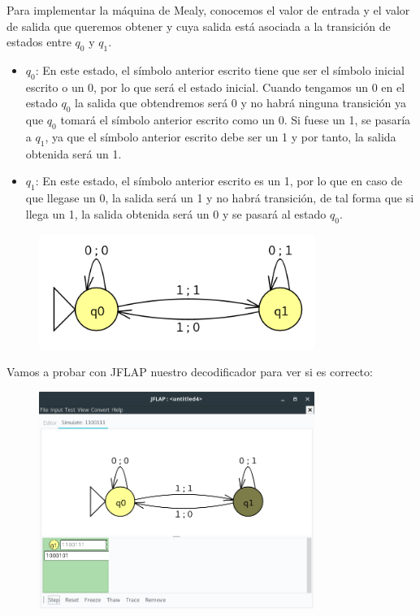\documentclass[10pt,a4paper,spanish]{report}
\begin{document}
\noindent
Para implementar la máquina de Mealy, conocemos el valor de entrada y el valor de salida que queremos obtener y cuya salida está asociada a la transición de estados entre $q_0$ y $q_1$.

\begin{itemize}
	\item $q_0$: En este estado, el símbolo anterior escrito tiene que ser el símbolo inicial escrito o un 0, por lo que será el estado inicial. Cuando tengamos un 0 en el estado $q_0$ la salida que obtendremos será 0 y no habrá ninguna transición ya que $q_0$ tomará el símbolo anterior escrito como un 0. Si fuese un 1, se pasaría a $q_1$, ya que el símbolo anterior escrito debe ser un 1 y por tanto, la salida obtenida será un 1.
	\item $q_1$: En este estado, el símbolo anterior escrito es un 1, por lo que en caso de que llegase un 0, la salida será un 1 y no habrá transición, de tal forma que si llega un 1, la salida obtenida será un 0 y se pasará al estado $q_0$.
\end{itemize}

\begin{figure}[!hbp]
	\centering  \includegraphics[width=0.8\textwidth]{Imagenes/Ejercicio3-1.png}
\end{figure}

\newpage
\noindent
Vamos a probar con JFLAP nuestro decodificador para ver si es correcto:

\begin{figure}[!hbp]
	\centering  \includegraphics[width=0.8\textwidth]{Imagenes/Ejercicio3-2.png}
\end{figure}
\end{document}
